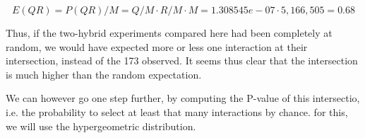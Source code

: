 \begin{enumerate}
\[E(QR) = P(QR)/M = Q/M \cdot R/M \cdot M = 1.308545e-07 \cdot 5,166,505 = 0.68\]

Thus, if the two-hybrid experiments compared here had been completely
at random, we would have expected more or less one interaction at
their intersection, instead of the 173 observed. It seems thus clear
that the intersection is much higher than the random expectation.

We can however go one step further, by computing the P-value of this
intersectio, i.e. the probability to select at least that many
interactions by chance. for this, we will use the hypergeometric
distribution.

\end{enumerate}
